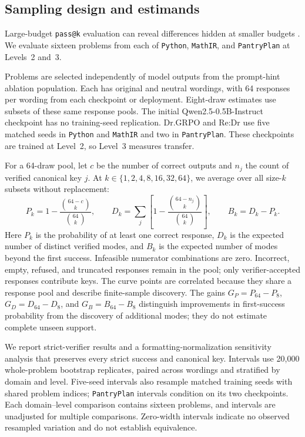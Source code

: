\subsection{Sampling design and estimands}
\label{sec:discovery-curves}
Large-budget \texttt{pass@k} evaluation can reveal differences hidden at smaller budgets \citep{yue2025rlvrlimit}. We evaluate sixteen problems from each of \texttt{Python}, \texttt{MathIR}, and \texttt{PantryPlan} at Levels~2 and~3.

Problems are selected independently of model outputs from the prompt-hint ablation population. Each has original and neutral wordings, with 64 responses per wording from each checkpoint or deployment. Eight-draw estimates use subsets of these same response pools. The initial Qwen2.5-0.5B-Instruct checkpoint has no training-seed replication. Dr.GRPO and Re:Dr use five matched seeds in \texttt{Python} and \texttt{MathIR} and two in \texttt{PantryPlan}. These checkpoints are trained at Level~2, so Level~3 measures transfer.

For a 64-draw pool, let $c$ be the number of correct outputs and $n_j$ the count of verified canonical key $j$. At $k\in\{1,2,4,8,16,32,64\}$, we average over all size-$k$ subsets without replacement:
\[
 P_k=1-\frac{\binom{64-c}{k}}{\binom{64}{k}},\qquad
 D_k=\sum_j\left[1-\frac{\binom{64-n_j}{k}}{\binom{64}{k}}\right],\qquad B_k=D_k-P_k.
\]
Here $P_k$ is the probability of at least one correct response, $D_k$ is the expected number of distinct verified modes, and $B_k$ is the expected number of modes beyond the first success. Infeasible numerator combinations are zero. Incorrect, empty, refused, and truncated responses remain in the pool; only verifier-accepted responses contribute keys. The curve points are correlated because they share a response pool and describe finite-sample discovery. The gains $G_P=P_{64}-P_8$, $G_D=D_{64}-D_8$, and $G_B=B_{64}-B_8$ distinguish improvements in first-success probability from the discovery of additional modes; they do not estimate complete unseen support.

We report strict-verifier results and a formatting-normalization sensitivity analysis that preserves every strict success and canonical key. Intervals use 20,000 whole-problem bootstrap replicates, paired across wordings and stratified by domain and level. Five-seed intervals also resample matched training seeds with shared problem indices; \texttt{PantryPlan} intervals condition on its two checkpoints. Each domain--level comparison contains sixteen problems, and intervals are unadjusted for multiple comparisons. Zero-width intervals indicate no observed resampled variation and do not establish equivalence.

